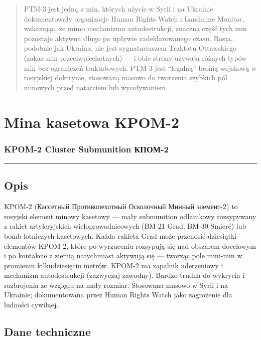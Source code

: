 \documentclass[12pt,openany,oneside]{book}
\begin{document}
\begin{quote}
PTM-3 jest jedną z min, których użycie w Syrii i na Ukrainie
dokumentowały organizacje Human Rights Watch i Landmine Monitor,
wskazując, że mimo mechanizmu autodestrukcji, znaczna część tych min
pozostaje aktywna długo po upływie zadeklarowanego czasu. Rosja,
podobnie jak Ukraina, nie jest sygnatariuszem Traktatu Ottawskiego
(zakaz min przeciwpiechotnych) --- i obie strony używają różnych typów
min bez ograniczeń traktatowych. PTM-3 jest ``legalną'' bronią wojskową
w rosyjskiej doktrynie, stosowaną masowo do tworzenia szybkich pól
minowych przed natarciem lub wycofywaniem.
\end{quote}

\chapter{Mina kasetowa KPOM-2}\label{mina-kasetowa-kpom-2}

\subsection{KPOM-2 Cluster Submunition \textbar{}
КПОМ-2}\label{kpom-2-cluster-submunition-ux43aux43fux43eux43c-2}

\begin{center}\rule{0.5\linewidth}{0.5pt}\end{center}

\section{Opis}\label{opis-117}

KPOM-2 (Кассетный Противопехотный Осколочный Минный элемент-2) to
rosyjski element minowy kasetowy --- mały submunition odłamkowy
rozsypywany z rakiet artyleryjskich wieloprowadnicowych (BM-21 Grad,
BM-30 Smierć) lub bomb lotniczych kasetowych. Każda rakieta Grad może
przenosić dziesiątki elementów KPOM-2, które po wyrzuceniu rozsypują się
nad obszarem docelowym i po kontakcie z ziemią natychmiast aktywują się
--- tworząc pole mini-min w promieniu kilkudziesięciu metrów. KPOM-2 ma
zapalnik uderzeniowy i mechanizm autodestrukcji (zazwyczaj zawodny).
Bardzo trudna do wykrycia i rozbrojenia ze względu na mały rozmiar.
Stosowana masowo w Syrii i na Ukrainie; dokumentowana przez Human Rights
Watch jako zagrożenie dla ludności cywilnej.

\section{Dane techniczne}\label{dane-techniczne-117}
\end{document}

